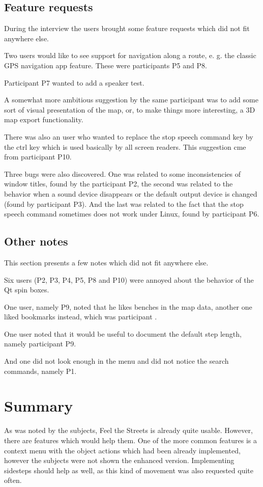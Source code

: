 \documentclass[nolof,digital]{fithesis3}
\begin{document}
\subsection{Feature requests}
During the interview the users brought some feature requests which did not fit anywhere else.

Two users would like to see support for navigation along a route, e. g. the classic GPS navigation app feature. These were participants P5 and P8.

Participant P7 wanted to add a speaker test.

A somewhat more ambitious suggestion by the same participant was to add some sort of visual presentation of the map, or, to make things more interesting, a 3D map export functionality.

There was also an user who wanted to replace the stop speech command key by the ctrl key which is used basically by all screen readers. This suggestion cme from participant P10.

Three bugs were also discovered. One was related to some inconsistencies of window titles, found by the participant P2, the second was related to the behavior when a sound device disappears or the default output device is changed (found by participant P3). And the last was related to the fact that the stop speech command sometimes does not work under Linux, found by participant P6.
\subsection{Other notes}
This section presents a few notes which did not fit anywhere else.

Six users (P2, P3, P4, P5, P8 and P10) were annoyed about the behavior of the Qt spin boxes.

One user, namely P9, noted that he likes benches in the map data, another one liked bookmarks instead, which was participant .

One user noted that it would be useful to document the default step length, namely participant P9.

And one did not look enough in the menu and did not notice the search commands, namely P1.
\section{Summary}
As was noted by the subjects, Feel the Streets is already quite usable. However, there are features which would help them. One of the more common features is a context menu with the object actions which had been already implemented, however the subjects were not shown the enhanced version. Implementing sidesteps should help as well, as this kind of movement was also requested quite often.
\end{document}
